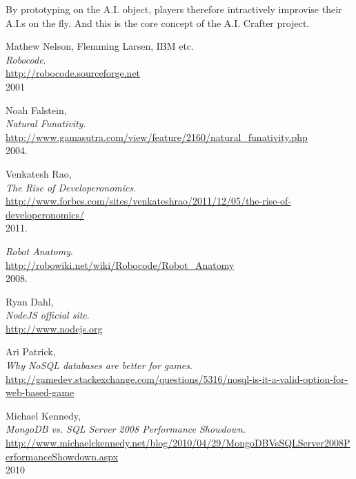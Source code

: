 \documentclass[12pt]{article}
\begin{document}
By prototyping on the A.I. object, players therefore intractively improvise their A.I.s on the fly. And this is the core concept of the A.I. Crafter project.\\

\begin{thebibliography}{9}

	Mathew Nelson, Flemming Larsen, IBM etc.\\
	\emph{Robocode}.\\
	\url{http://robocode.sourceforge.net}\\
	2001

	Noah Falstein,\\
	\emph{Natural Funativity}.\\
	\url{http://www.gamasutra.com/view/feature/2160/natural\_funativity.php}\\
	2004.

	Venkatesh Rao,\\
	\emph{The Rise of Developeronomics}.\\
	\url{http://www.forbes.com/sites/venkateshrao/2011/12/05/the-rise-of-developeronomics/}\\
	2011.

	\emph{Robot Anatomy}. \\
	\url{http://robowiki.net/wiki/Robocode/Robot\_Anatomy}\\
	2008.

	Ryan Dahl,\\
	\emph{NodeJS official site}.\\
	\url{http://www.nodejs.org}

	Ari Patrick,\\
	\emph{Why NoSQL databases are better for games}.\\
	\url{http://gamedev.stackexchange.com/questions/5316/nosql-is-it-a-valid-option-for-web-based-game}

	Michael Kennedy,\\
	\emph{MongoDB vs. SQL Server 2008 Performance Showdown}.\\
	\url{http://www.michaelckennedy.net/blog/2010/04/29/MongoDBVsSQLServer2008PerformanceShowdown.aspx}\\
	2010

\end{thebibliography}

	
\end{document}
